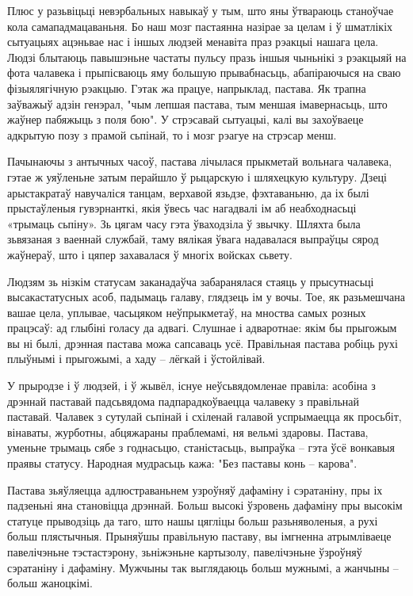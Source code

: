 Плюс у разьвіцьці невэрбальных навыкаў у тым, што яны ўтвараюць станоўчае кола самападмацаваньня. Бо наш мозг пастаянна назірае за целам і ў шматлікіх сытуацыях ацэньвае нас і іншых людзей менавіта праз рэакцыі нашага цела. Людзі блытаюць павышэньне частаты пульсу празь іншыя чыньнікі з рэакцыяй на фота чалавека і прыпісваюць яму большую прывабнасьць, абапіраючыся на сваю фізыялягічную рэакцыю. Гэтак жа працуе, напрыклад, пастава. Як трапна заўважыў адзін генэрал, "чым лепшая пастава, тым меншая імавернасьць, што жаўнер пабяжыць з поля бою". У стрэсавай сытуацыі, калі вы захоўваеце адкрытую позу з прамой сьпінай, то і мозг рэагуе на стрэсар менш.

Пачынаючы з антычных часоў, пастава лічылася прыкметай вольнага чалавека, гэтае ж уяўленьне затым перайшло ў рыцарскую і шляхецкую культуру. Дзеці арыстакратаў навучаліся танцам, верхавой язьдзе, фэхтаваньню, да іх былі прыстаўленыя гувэрнанткі, якія ўвесь час нагадвалі ім аб неабходнасьці «трымаць сьпіну». Зь цягам часу гэта ўваходзіла ў звычку. Шляхта была зьвязаная з ваеннай службай, таму вялікая ўвага надавалася выпраўцы сярод жаўнераў, што і цяпер захавалася ў многіх войсках сьвету.

Людзям зь нізкім статусам заканадаўча забаранялася стаяць у прысутнасьці высакастатусных асоб, падымаць галаву, глядзець ім у вочы. Тое, як разьмешчана вашае цела, уплывае, часьцяком неўпрыкметаў, на мноства самых розных працэсаў: ад глыбіні голасу да адвагі. Слушнае і адваротнае: якім бы прыгожым вы ні былі, дрэнная пастава можа сапсаваць усё. Правільная пастава робіць рухі плыўнымі і прыгожымі, а хаду – лёгкай і ўстойлівай.

У прыродзе і ў людзей, і ў жывёл, існуе неўсьвядомленае правіла: асобіна з дрэннай паставай падсьвядома падпарадкоўваецца чалавеку з правільнай паставай. Чалавек з сутулай сьпінай і схіленай галавой успрымаецца як просьбіт, вінаваты, журботны, абцяжараны праблемамі, ня вельмі здаровы. Пастава, уменьне трымаць сябе з годнасьцю, станістасьць, выпраўка – гэта ўсё вонкавыя праявы статусу. Народная мудрасьць кажа: "Без паставы конь – карова".

Пастава зьяўляецца адлюстраваньнем узроўняў дафаміну і сэратаніну, пры іх падзеньні яна становіцца дрэннай. Больш высокі ўзровень дафаміну пры высокім статуце прыводзіць да таго, што нашы цягліцы больш разьняволеныя, а рухі больш плястычныя. Прыняўшы правільную паставу, вы імгненна атрымліваеце павелічэньне тэстастэрону, зьніжэньне картызолу, павелічэньне ўзроўняў сэратаніну і дафаміну. Мужчыны так выглядаюць больш мужнымі, а жанчыны – больш жаноцкімі.

